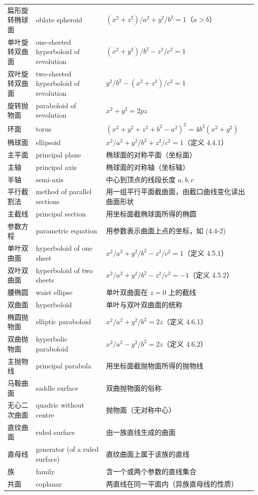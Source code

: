 \documentclass[UTF8,11pt,a4paper]{ctexart}
\theoremstyle{definition}
\begin{document}
\begin{small}
\begin{longtable}{@{}p{3.4cm}p{4.6cm}p{7.4cm}@{}}
扁形旋转椭球面 & oblate spheroid & $(x^2+z^2)/a^2+y^2/b^2=1$（$a>b$） \\
单叶旋转双曲面 & one-sheeted hyperboloid of revolution & $(x^2+y^2)/b^2-z^2/c^2=1$ \\
双叶旋转双曲面 & two-sheeted hyperboloid of revolution & $y^2/b^2-(x^2+z^2)/c^2=1$ \\
旋转抛物面 & paraboloid of revolution & $x^2+y^2=2pz$ \\
环面 & torus & $(x^2+y^2+z^2+b^2-a^2)^2=4b^2(x^2+y^2)$ \\
椭球面 & ellipsoid & $x^2/a^2+y^2/b^2+z^2/c^2=1$（定义 4.4.1） \\
主平面 & principal plane & 椭球面的对称平面（坐标面） \\
主轴 & principal axis & 椭球面的对称轴（坐标轴） \\
半轴 & semi-axis & 中心到顶点的线段长度 $a,b,c$ \\
平行截割法 & method of parallel sections & 用一组平行平面截曲面，由截口曲线变化读出曲面形状 \\
主截线 & principal section & 用坐标面截椭球面所得的椭圆 \\
参数方程 & parametric equation & 用参数表示曲面上点的坐标，如 (4.4-2) \\
单叶双曲面 & hyperboloid of one sheet & $x^2/a^2+y^2/b^2-z^2/c^2=1$（定义 4.5.1） \\
双叶双曲面 & hyperboloid of two sheets & $x^2/a^2+y^2/b^2-z^2/c^2=-1$（定义 4.5.2） \\
腰椭圆 & waist ellipse & 单叶双曲面在 $z=0$ 上的截线 \\
双曲面 & hyperboloid & 单叶与双叶双曲面的统称 \\
椭圆抛物面 & elliptic paraboloid & $x^2/a^2+y^2/b^2=2z$（定义 4.6.1） \\
双曲抛物面 & hyperbolic paraboloid & $x^2/a^2-y^2/b^2=2z$（定义 4.6.2） \\
主抛物线 & principal parabola & 用坐标面截抛物面所得的抛物线 \\
马鞍曲面 & saddle surface & 双曲抛物面的俗称 \\
无心二次曲面 & quadric without centre & 抛物面（无对称中心） \\
直纹曲面 & ruled surface & 由一族直线生成的曲面 \\
直母线 & generator (of a ruled surface) & 直纹曲面上属于该族的直线 \\
族 & family & 含一个或两个参数的直线集合 \\
共面 & coplanar & 两直线在同一平面内（异族直母线的性质） \\

\end{longtable}
\end{small}
\end{document}
